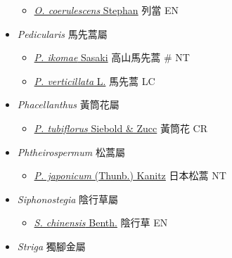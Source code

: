 \begin{itemize}
  \begin{itemize}
        \item[] \href{http://www.theplantlist.org/tpl1.1/search?q=Orobanche+coerulescens}{\textit{O. coerulescens} Stephan}   列當   EN
  \end{itemize}
 \item[] \textit{Pedicularis} 馬先蒿屬
                                
  \begin{itemize}
        \item[] \href{http://www.theplantlist.org/tpl1.1/search?q=Pedicularis+ikomae}{\textit{P. ikomae} Sasaki}   高山馬先蒿  \# NT
        \item[] \href{http://www.theplantlist.org/tpl1.1/search?q=Pedicularis+verticillata}{\textit{P. verticillata} L.}   馬先蒿   LC
  \end{itemize}
 \item[] \textit{Phacellanthus} 黃筒花屬
                                
  \begin{itemize}
        \item[] \href{http://www.theplantlist.org/tpl1.1/search?q=Phacellanthus+tubiflorus}{\textit{P. tubiflorus} Siebold \& Zucc}   黃筒花   CR
  \end{itemize}
 \item[] \textit{Phtheirospermum} 松蒿屬
                                
  \begin{itemize}
        \item[] \href{http://www.theplantlist.org/tpl1.1/search?q=Phtheirospermum+japonicum}{\textit{P. japonicum} (Thunb.) Kanitz}   日本松蒿   NT
  \end{itemize}
 \item[] \textit{Siphonostegia} 陰行草屬
                                
  \begin{itemize}
        \item[] \href{http://www.theplantlist.org/tpl1.1/search?q=Siphonostegia+chinensis}{\textit{S. chinensis} Benth.}   陰行草   EN
  \end{itemize}
 \item[] \textit{Striga} 獨腳金屬
                                

\end{itemize}
